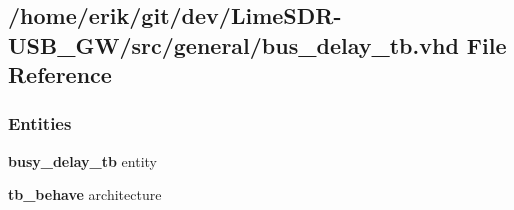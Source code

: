 \subsection{/home/erik/git/dev/\+Lime\+S\+D\+R-\/\+U\+S\+B\+\_\+\+G\+W/src/general/bus\+\_\+delay\+\_\+tb.vhd File Reference}
\label{bus__delay__tb_8vhd}
\subsubsection*{Entities}
\begin{DoxyCompactItemize}
\item 
{\bf busy\+\_\+delay\+\_\+tb} entity
\item 
{\bf tb\+\_\+behave} architecture
\end{DoxyCompactItemize}
